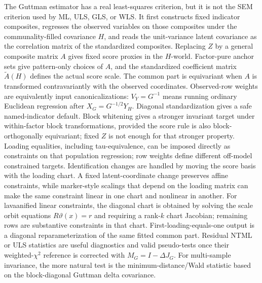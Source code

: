 \documentclass[11pt]{article}
\theoremstyle{plain}
\theoremstyle{remark}
\begin{document}
The Guttman estimator has a real least-squares criterion, but it is not the SEM
criterion used by ML, ULS, GLS, or WLS. It first constructs fixed indicator
composites, regresses the observed variables on those composites under the
communality-filled covariance \(H\), and reads the unit-variance latent
covariance as the correlation matrix of the standardized composites.
Replacing \(Z\) by a general composite matrix \(A\) gives fixed score proxies
in the \(H\)-world. Factor-pure anchor sets give pattern-only choices of \(A\),
and the standardized coefficient matrix \(\widetilde A(H)\) defines the actual
score scale. The common part is equivariant when \(A\) is transformed
contravariantly with the observed coordinates.
Observed-row weights are equivalently input canonicalizations:
\(V_Y=G^{-1}\) means running ordinary Euclidean regression after
\(X_G=G^{-1/2}Y_H\). Diagonal standardization gives a safe named-indicator
default. Block whitening gives a stronger invariant target under
within-factor block transformations, provided the score rule is also
block-orthogonally equivariant; fixed \(Z\) is not enough for that stronger
property.
Loading equalities, including tau-equivalence, can be imposed directly as
constraints on that population regression; row weights define different
off-model constrained targets. Identification changes are handled by moving
the score basis with the loading chart. A fixed latent-coordinate change
preserves affine constraints, while marker-style scalings that depend on the
loading matrix can make the same constraint linear in one chart and nonlinear
in another. For lavaanified linear constraints, the diagonal chart is obtained
by solving the scale orbit equations \(R\vartheta(x)=r\) and requiring a
rank-\(k\) chart Jacobian; remaining rows are substantive constraints in that
chart. First-loading-equals-one output is a diagonal reparameterization of the
same fitted common part. Residual NTML or ULS
statistics are useful diagnostics and valid pseudo-tests once their
weighted-\(\chi^2\) reference is corrected with
\(M_G=I-\Delta J_G\). For multi-sample invariance, the more natural test is the
minimum-distance/Wald statistic based on the block-diagonal Guttman delta
covariance.
\end{document}
